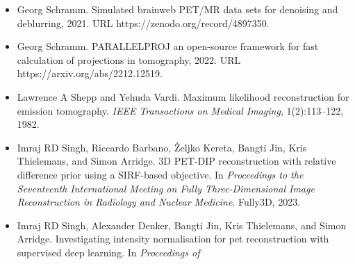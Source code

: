 \documentclass{article}
\begin{document}
\begin{itemize}
\item 
Georg Schramm. Simulated brainweb PET/MR data sets for denoising and deblurring, 2021. URL https://zenodo.org/record/4897350.

\item 
Georg Schramm. PARALLELPROJ an open-source framework for fast calculation of projections in tomography, 2022. URL https://arxiv.org/abs/2212.12519.

\item 
Lawrence A Shepp and Yehuda Vardi. Maximum likelihood reconstruction for emission tomography. \textit{IEEE Transactions on Medical Imaging}, 1(2):113–122, 1982.

\item 
Imraj RD Singh, Riccardo Barbano, Željko Kereta, Bangti Jin, Kris Thielemans, and Simon Arridge. 3D PET-DIP reconstruction with relative difference prior using a SIRF-based objective. In \textit{Proceedings to the Seventeenth International Meeting on Fully Three-Dimensional Image Reconstruction in Radiology and Nuclear Medicine}. Fully3D, 2023.

\item 
Imraj RD Singh, Alexander Denker, Bangti Jin, Kris Thielemans, and Simon Arridge. Investigating intensity normalisation for pet reconstruction with supervised deep learning. In \textit{Proceedings of}

\end{itemize}
\end{document}
